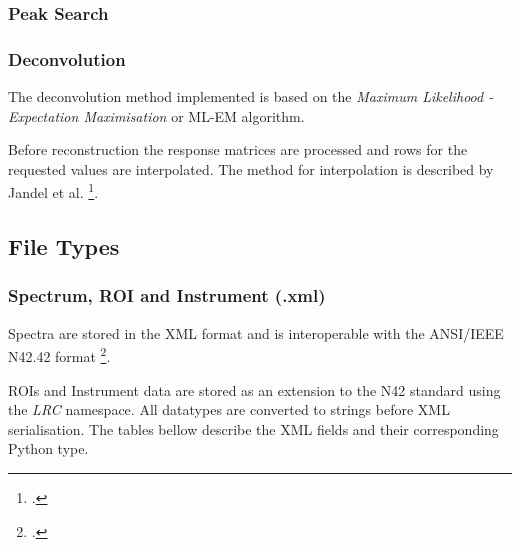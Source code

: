 \subsubsection{Peak Search}

\subsubsection{Deconvolution}
The deconvolution method implemented is based on the \textit{Maximum Likelihood - Expectation Maximisation} or ML-EM algorithm. 

Before reconstruction the response matrices are processed and rows for the requested values are interpolated. The method for interpolation is described by Jandel et al. \footcite{jandelDecompositionContinuumGray2004}.




\subsection{File Types}
\subsubsection{Spectrum, ROI and Instrument (.xml)}
Spectra are stored in the XML format and is interoperable with the ANSI/IEEE N42.42 format \footcite{DocumentaryStandardsANSI}.

ROIs and Instrument data are stored as an extension to the N42 standard using the \textit{LRC} namespace. All datatypes are converted to strings before XML serialisation. The tables bellow describe the XML fields and their corresponding Python type.

